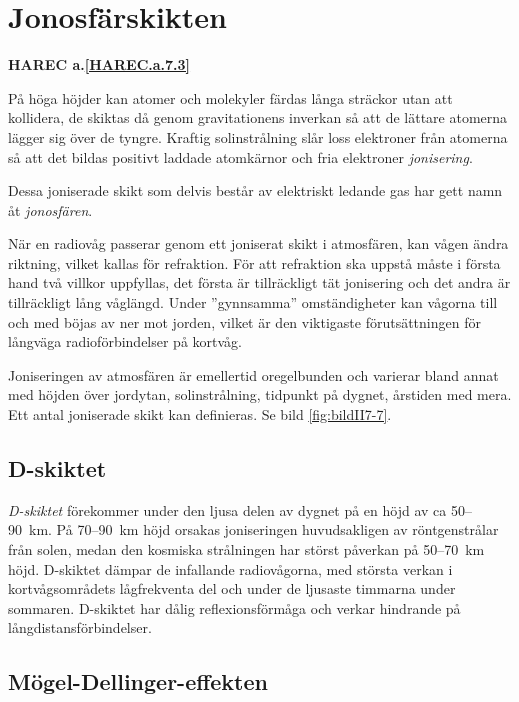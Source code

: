 \section{Jonosfärskikten}
\textbf{
HAREC a.\ref{HAREC.a.7.3}\label{myHAREC.a.7.3}
}

På höga höjder kan atomer och molekyler färdas långa sträckor utan att
kollidera, de skiktas då genom gravitationens inverkan så att de lättare
atomerna lägger sig över de tyngre.
Kraftig solinstrålning slår loss elektroner från atomerna så att det bildas
positivt laddade atomkärnor och fria elektroner \emph{jonisering}.

Dessa joniserade skikt som delvis består av elektriskt ledande gas har
gett namn åt \emph{jonosfären}.

När en radiovåg passerar genom ett joniserat skikt i atmosfären, kan vågen
ändra riktning, vilket kallas för refraktion.
För att refraktion ska uppstå måste i första hand två villkor uppfyllas, det
första är tillräckligt tät jonisering och det andra är tillräckligt
lång våglängd.
Under ''gynnsamma'' omständigheter kan vågorna till och med böjas av
ner mot jorden, vilket är den viktigaste förutsättningen för långväga
radioförbindelser på kortvåg.

Joniseringen av atmosfären är emellertid oregelbunden och varierar
bland annat med höjden över jordytan, solinstrålning, tidpunkt på dygnet,
årstiden med mera.
Ett antal joniserade skikt kan definieras.
Se bild \ref{fig:bildII7-7}.

\subsection{D-skiktet}

\emph{D-skiktet} förekommer under den ljusa delen av dygnet på en höjd av ca
50--90~km.
På 70--90~km höjd orsakas joniseringen huvudsakligen av röntgenstrålar från
solen, medan den kosmiska strålningen har störst påverkan på 50--70~km höjd.
D-skiktet dämpar de infallande radiovågorna, med största verkan i
kortvågsområdets lågfrekventa del och under de ljusaste timmarna under sommaren.
D-skiktet har dålig reflexionsförmåga och verkar hindrande på
långdistansförbindelser.

\subsection{Mögel-Dellinger-effekten}

